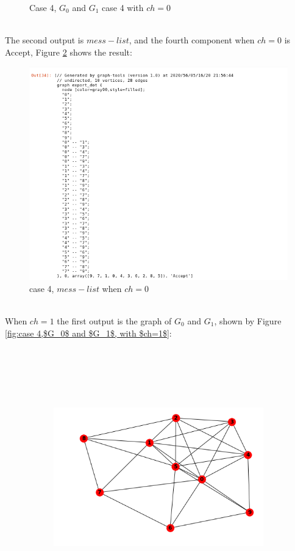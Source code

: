 \documentclass[12pt,a4paper]{article}
\begin{document}
\begin{itemize}
\begin{figure}[h!]
	\caption{ Case 4, $G_0$ and $G_1$ case 4 with $ch=0$}
	\label{fig: case 4, $G_0$ and $G_1$, with $ch=0$}
\end{figure}\\
The second output is $mess-list$, and the fourth component when $ch=0$ is Accept, Figure \ref{fig:3-25} shows the result:
\begin{figure}[h]
	\centering
	\includegraphics[width=0.7\linewidth]{3-25}
	\caption{case 4, $mess-list$ when $ch=0$}
	\label{fig:3-25}
\end{figure}\\
When $ch=1$ the first output is the graph of $G_0$ and $G_1$, shown by Figure \ref{fig:case 4,$G_0$ and $G_1$, with $ch=1$}:\\
\\
\\
\\
\\
\\
\begin{figure}[h!]
	\centering\begin{subfigure}[b]{.45\linewidth}
		\includegraphics[width=\linewidth]{3-26.png}

\end{subfigure}
\end{figure}
\end{itemize}
\end{document}
